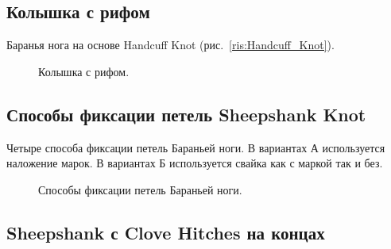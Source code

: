 \subsection{Колышка с рифом}

Баранья нога на основе Handcuff Knot (рис.~\ref{ris:Handcuff_Knot}).

\begin{figure}[H]\centering
	\subfloat[Завязывание]{\label{ris:Sheepshank_from_a_Handcuff_Knot_1}
	\tcbox[enhanced jigsaw,colframe=black,opacityframe=0.5,opacityback=0.5]
		{\centering
			}
		}
\end{figure}

\begin{figure}[H]\centering
	\subfloat[Результат]{\label{ris:Sheepshank_from_a_Handcuff_Knot_2}
	\tcbox[enhanced jigsaw,colframe=black,opacityframe=0.5,opacityback=0.5]
		{\centering
			}
		}
	\caption{Колышка с рифом.}\label{ris:Sheepshank_from_a_Handcuff_Knot}
\end{figure}

\subsection{Способы фиксации петель Sheepshank Knot}

Четыре способа фиксации петель Бараньей ноги. В вариантах А используется наложение марок. В вариантах Б используется свайка как с маркой так и без.

\begin{figure}[H]\centering
	\subfloat[С марками]{\label{ris:Fix_Sheepshank_Knot_1}
	\tcbox[enhanced jigsaw,colframe=black,opacityframe=0.5,opacityback=0.5]
		{\centering
			}
		}
\end{figure}

\begin{figure}[H]\centering
	\subfloat[Со свайками]{\label{ris:Fix_Sheepshank_Knot_2}
	\tcbox[enhanced jigsaw,colframe=black,opacityframe=0.5,opacityback=0.5]
		{\centering
			}
		}
	\caption{Способы фиксации петель Бараньей ноги.}\label{ris:Fix_Sheepshank_Knot}
\end{figure}

\subsection{Sheepshank с Clove Hitches на концах}

